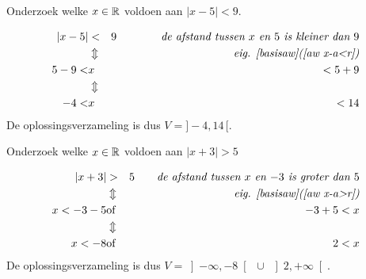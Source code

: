 \documentclass[numbers,wordchoicegiven]{ximera}
\begin{document}
\begin{problem} Onderzoek welke $x\in \mathbb{R}$ voldoen aan $|x-5|<9.$
		\begin{expandable}
		\begin{oplossing} 
			\begin{eqnarray*}
				|x-5|&<&9 \qquad\qquad \textit{de afstand tussen $x$ en $5$ is kleiner dan $9$}\\
				&\Updownarrow &\textit{eig. \ref{basisaw}(\ref{aw x-a<r})}\\
				5-9<&x&<5+9\\
				&\Updownarrow &\\
				-4<&x&<14
			\end{eqnarray*}
			De oplossingsverzameling is dus $V=]-4,14\,[.$
		\end{oplossing}
		\end{expandable}
	\end{problem}
\begin{problem}	Onderzoek welke $x\in \mathbb{R}$ voldoen aan $|x+3|>5$
		\begin{expandable}
		\begin{oplossing} 
			\begin{eqnarray*}
				|x+3|&>&5 \qquad \textit{de afstand tussen $x$ en $-3$ is groter dan $5$}\\
				&\Updownarrow &\textit{eig. \ref{basisaw}(\ref{aw x-a>r})}
				\\x<-3-5&\mbox{of}&-3+5<x\\
				&\Updownarrow &\\
				x<-8&\mbox{of}&2<x
			\end{eqnarray*}
			De oplossingsverzameling is dus $V=\left]-\infty,-8\right[
			\;\cup\;\left]2, +\infty\right[.$
		\end{oplossing}
		\end{expandable}

\end{problem}
\end{document}

